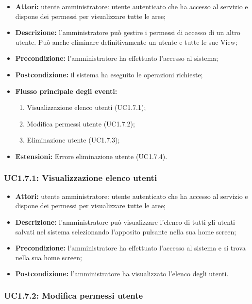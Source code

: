 \begin{itemize}
    \item \textbf{Attori:} utente amministratore: utente autenticato che ha accesso al servizio e dispone dei permessi per visualizzare tutte le aree;
    \item \textbf{Descrizione:} l'amministratore può gestire i permessi di accesso di un altro utente. Può anche eliminare definitivamente un utente e tutte le sue View\gloss{};
    \item \textbf{Precondizione:} l'amministratore ha effettuato l'accesso al sistema;
    \item \textbf{Postcondizione:} il sistema ha eseguito le operazioni richieste;
    \item \textbf{Flusso principale degli eventi:}
    \begin{enumerate}
        \item Visualizzazione elenco utenti (UC1.7.1);
        \item Modifica permessi utente (UC1.7.2);
        \item Eliminazione utente (UC1.7.3);
    \end{enumerate}
    \item \textbf{Estensioni:} Errore eliminazione utente (UC1.7.4).
\end{itemize}

\subsubsection{UC1.7.1: Visualizzazione elenco utenti}

\begin{itemize}
    \item \textbf{Attori:} utente amministratore: utente autenticato che ha accesso al servizio e dispone dei permessi per visualizzare tutte le aree;
    \item \textbf{Descrizione:} l'amministratore può visualizzare l'elenco di tutti gli utenti salvati nel sistema selezionando l'apposito pulsante nella sua home screen;
    \item \textbf{Precondizione:} l'amministratore ha effettuato l'accesso al sistema e si trova nella sua home screen;
    \item \textbf{Postcondizione:} l'amministratore ha visualizzato l'elenco degli utenti.
\end{itemize}

\subsubsection{UC1.7.2: Modifica permessi utente}

